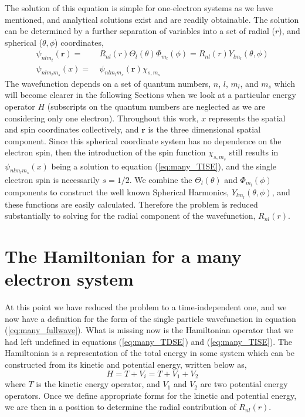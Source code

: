 The solution of this equation is simple for one-electron systems as we have mentioned, and analytical solutions exist and are readily obtainable. The solution can be determined by a further separation of variables into a set of radial ($r$), and spherical ($\theta, \phi$) coordinates,
	\begin{equation}\label{eq:many_fullwave}
	\begin{split}
	\psi_{nlm_l}(\boldsymbol{r}) =& ~R_{nl}(r)\Theta_{l}(\theta)\Phi_{m_l}(\phi)=R_{nl}(r)Y_{lm_l}(\theta,\phi)\\
	\psi_{nlm_lm_s}(x) =& ~\psi_{nlm_lm_s}(\boldsymbol{r})\chi_{s,m_s}
	\end{split}
	\end{equation}
The wavefunction depends on a set of quantum numbers, $n$, $l$, $m_l$, and $m_s$ which will become clearer in the following Sections when we look at a particular energy operator $H$ (subscripts on the quantum numbers are neglected as we are considering only one electron). Throughout this work, $x$ represents the spatial and spin coordinates collectively, and $\boldsymbol{r}$ is the three dimensional spatial component. Since this spherical coordinate system has no dependence on the electron spin, then the introduction of the spin function $\chi_{s,m_s}$ still results in $\psi_{nlm_lm_s}(x)$ being a solution to equation (\ref{eq:many_TISE}), and the single electron spin is necessarily $s=1/2$. We combine the $\Theta_l(\theta)$ and $\Phi_{m_l}(\phi)$ components to construct the well known Spherical Harmonics, $Y_{lm_l}(\theta,\phi)$, and these functions are easily calculated. Therefore the problem is reduced substantially to solving for the radial component of the wavefunction, $R_{nl}(r)$.

\section{The Hamiltonian for a many electron system}\label{sec:theham}
At this point we have reduced the problem to a time-independent one, and we now have a definition for the form of the single particle wavefunction in equation (\ref{eq:many_fullwave}). What is missing now is the Hamiltonian operator that we had left undefined in equations (\ref{eq:many_TDSE}) and (\ref{eq:many_TISE}). The Hamiltonian is a representation of the total energy in some system which can be constructed from its kinetic and potential energy, written below as,
	\begin{equation}\label{eq:many_TV1V2}
	H=T+V_i=T+V_1 + V_2
	\end{equation}
where $T$ is the kinetic energy operator, and $V_1$ and $V_2$ are two potential energy operators. Once we define appropriate forms for the kinetic and potential energy, we are then in a position to determine the radial contribution of $R_{nl}(r)$.

